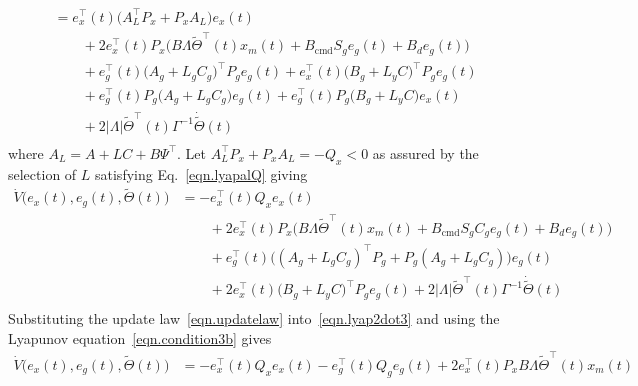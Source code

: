 \begin{proof-dan}
\begin{equation}
\begin{split}
      &=
      e_{x}^{\top}(t)\bigr(A_{L}^{\top}P_{x}  + P_{x} A_{L}\bigr)e_{x}(t) \\
      & \qquad
      + 2e_{x}^{\top}(t)P_{x}\bigr(B\Lambda\widetilde{\Theta}^{\top}(t)x_{m}(t)+ B_{\text{cmd}}S_{g}e_{g}(t) + B_{d}e_{g}(t) \bigr) \\
      & \qquad
      + e_{g}^{\top}(t)\bigr(A_{g}+L_{g}C_{g}\bigr)^{\top}P_{g}e_{g}(t)
      + e_{x}^{\top}(t)\bigr(B_{g}+L_{y}C\bigr)^{\top}P_{g}e_{g}(t) \\
      & \qquad
      + e_{g}^{\top}(t)P_{g}\bigr(A_{g}+L_{g}C_{g}\bigr)e_{g}(t)
      + e_{g}^{\top}(t)P_{g}\bigr(B_{g}+L_{y}C\bigr)e_{x}(t) \\
      & \qquad
      + 2|\Lambda|\widetilde{\Theta}^{\top}(t)\Gamma^{-1}\dot{\widetilde{\Theta}}(t) \\
    \end{split}
  \end{equation}
  where $A_{L} = A+LC+B\Psi^{\top}$.
  Let $A_{L}^{\top}P_{x}+P_{x}A_{L}=-Q_{x}<0$ as assured by the selection of $L$ satisfying Eq.\ \eqref{eqn.lyapalQ} giving
  \begin{equation}
    \label{eqn.lyap2dot3}
    \begin{split}
      \dot{V}\bigr(e_{x}(t), e_{g}(t), \widetilde{\Theta}(t)\bigr)
      &=
      - e_{x}^{\top}(t)Q_{x}e_{x}(t) \\
      & \qquad
      + 2e_{x}^{\top}(t)P_{x}\bigr(B\Lambda\widetilde{\Theta}^{\top}(t)x_{m}(t)
      + B_{\text{cmd}}S_{g}C_{g}e_{g}(t) + B_{d}e_{g}(t) \bigr) \\
      & \qquad
      + e_{g}^{\top}(t)\bigr((A_{g}+L_{g}C_{g})^{\top}P_{g}+P_{g}(A_{g}+L_{g}C_{g})\bigr)e_{g}(t) \\
      & \qquad
      + 2e_{x}^{\top}(t)\bigr(B_{g}+L_{y}C\bigr)^{\top}P_{g}e_{g}(t)
      + 2|\Lambda|\widetilde{\Theta}^{\top}(t)\Gamma^{-1}\dot{\widetilde{\Theta}}(t) \\
    \end{split}
  \end{equation}
  Substituting the update law\ \eqref{eqn.updatelaw} into\ \eqref{eqn.lyap2dot3} and using the Lyapunov equation\ \eqref{eqn.condition3b} gives
  \begin{equation*}
    \begin{split}
      \dot{V}\bigr(e_{x}(t), e_{g}(t), \widetilde{\Theta}(t)\bigr)
      &=
      - e_{x}^{\top}(t)Q_{x}e_{x}(t)
      - e_{g}^{\top}(t)Q_{g}e_{g}(t)
      + 2e_{x}^{\top}(t)P_{x}B\Lambda\widetilde{\Theta}^{\top}(t)x_{m}(t) \\

\end{split}
\end{equation*}
\end{proof-dan}
